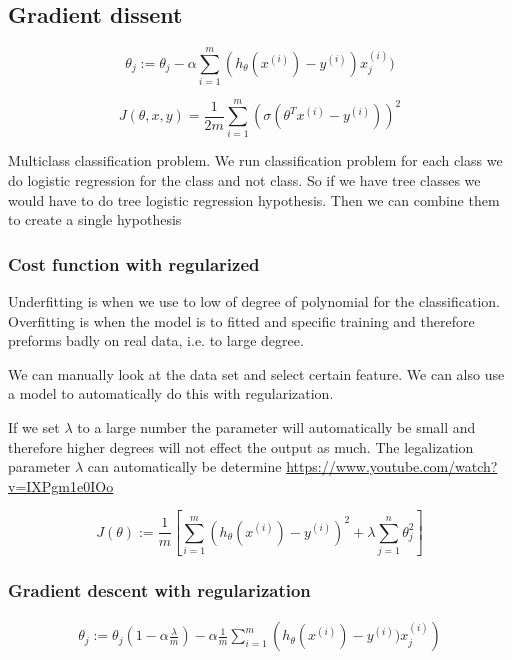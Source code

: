 \subsection{Gradient dissent}
\begin{equation*}
    \theta_j := \theta_j -\alpha\sum_{i=1}^m (h_{\theta}(x^{(i)}) - y^{(i)})x_j^{(i)})
\end{equation*}

\begin{equation*}
    J(\theta, x, y) = \frac{1}{2m}\sum_{i=1}^m\left( \sigma\left( \theta^Tx^{(i)} -y^{(i)} \right) \right)^2
\end{equation*}

Multiclass classification problem.
We run classification problem for each class we do logistic regression for 
the class and not class. So if we have tree classes we would have to do tree 
logistic regression hypothesis. Then we can combine them to create a single hypothesis


\subsubsection{Cost function with regularized}
Underfitting is when we use to low of degree of polynomial for the classification.
Overfitting is when the model is to fitted and specific training and therefore preforms badly 
on real data, i.e. to large degree.

We can manually look at the data set and select certain feature.
We can also use a model to automatically do this with regularization.

If we set $\lambda$ to a large number the parameter will automatically be small and 
therefore higher degrees will not effect the output as much.
The legalization parameter $\lambda$ can automatically be determine \newline
\url{https://www.youtube.com/watch?v=IXPgm1e0IOo}

\begin{equation*}
    J(\theta) := \frac{1}{m}\left[\sum_{i=1}^m (h_{\theta}(x^{(i)}) - y^{(i)})^2 + \lambda\sum_{j=1}^n \theta_j^2\right]
\end{equation*}

\subsubsection{Gradient descent with regularization}
\begin{align*}
    \theta_j := \theta_j\left(1-\alpha\frac{\lambda}{m}\right) - \alpha\frac{1}{m}\sum_{i=1}^m \left(h_{\theta}(x^{(i)}) - y^{(i)})x_j^{(i)}\right)
\end{align*}

